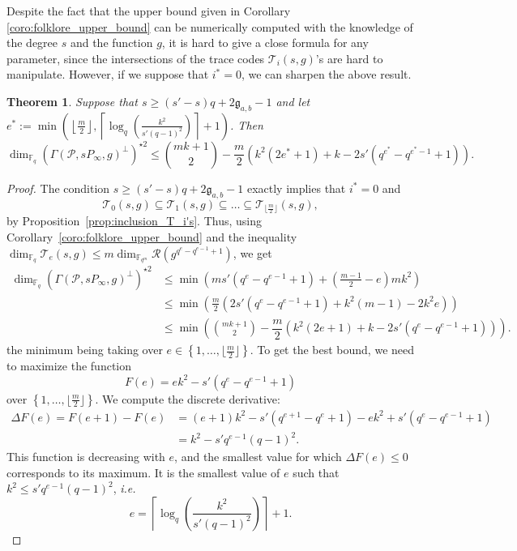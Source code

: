 \documentclass[lettersize,journal]{IEEEtran}
\theoremstyle{plain}
\newtheorem{thm}{Theorem}[section]
\theoremstyle{definition}
\theoremstyle{remark}
\newcommand{\calP}{\mathcal{P}}
\newcommand{\calR}{\mathcal{R}}
\newcommand{\calT}{\mathcal{T}}
\newcommand{\fqm}{\mathbb{F}_{q^m}}
\newcommand{\fq}{\mathbb{F}_{q}}
\newcommand{\set}[1]{\left\{#1\right\}}
\begin{document}
	Despite the fact that the upper bound given in Corollary \ref{coro:folklore_upper_bound} can be numerically computed with the knowledge of the degree $s$ and the function $g$, it is hard to give a close formula for any parameter, since the intersections of the trace codes $\calT_i(s,g)$'s are hard to manipulate. However, if we suppose that $i^*=0$, we can sharpen the above result.
	
	\begin{thm} \label{thm:bound_with_T_i's_inclusion} 
		Suppose that $s \geq (s'-s)q+2\mathfrak{g}_{a,b}-1$ and let $e^* := \min\left(\left\lfloor \frac{m}{2} \right\rfloor, \left\lceil \log_q\left(\frac{k^2}{s'(q-1)^2}\right)\right\rceil+1\right)$. Then
		$$\dim_{\fq} (\Gamma(\calP,sP_\infty,g)^{\perp})^{\star 2}\leq \binom{mk+1}{2} - \dfrac{m}{2}(k^2(2e^*+1)+k-2s'(q^{e^*}-q^{e^*-1}+1)). $$
	\end{thm}
	
	\begin{proof}
		The condition $s \geq (s'-s)q+2\mathfrak{g}_{a,b}-1$ exactly implies that $i^*=0$ and $$\calT_0(s,g) \subseteq \calT_1(s,g) \subseteq \dots \subseteq \calT_{\lfloor \frac{m}{2}\rfloor}(s,g),$$ 
		by Proposition~\ref{prop:inclusion_T_i's}. Thus, using Corollary~\ref{coro:folklore_upper_bound} and the inequality $\dim_{\fq}\calT_e(s,g) \leq m \dim_{\fqm} \calR(g^{q^e-q^{e-1}+1})$, we get
		\begin{align*}
			\dim_{\fq} (\Gamma(\calP,sP_\infty,g)^{\perp})^{\star 2}
			& \leq \min \left(ms'(q^e-q^{e-1}+1) + \left( \frac{m-1}{2} -e \right)mk^2 \right)\\
			& \leq \min \left(\frac{m}{2}\left(2s'(q^e-q^{e-1}+1)+k^2(m-1)-2k^2e  \right)\right) \\
			& \leq \min\left(\binom{mk+1}{2} - \dfrac{m}{2}\left(k^2(2e+1)+k-2s'(q^e-q^{e-1}+1)\right)\right).
		\end{align*}
		the minimum being taking over $e \in \set{1,\dots,\lfloor \frac{m}{2} \rfloor}$. 
		To get the best bound, we need to maximize the function
		$$F(e) = ek^2-s'(q^e-q^{e-1}+1)$$
		over $\set{1,\dots,\lfloor \frac{m}{2} \rfloor}$.
		We compute the discrete derivative:
		\begin{align*}
			\Delta F(e) = F(e+1)-F(e) &= (e+1)k^2- s'(q^{e+1}-q^e+1) - ek^2 + s'(q^e-q^{e-1}+1) \\
			&= k^2 - s'q^{e-1}(q-1)^2.
		\end{align*}
		This function is decreasing with $e$, and the smallest value for which $\Delta F(e) \leq 0$ corresponds to its maximum. It is the smallest value of $e$ such that $k^2 \leq s'q^{e-1}(q-1)^2$, \emph{i.e.}
		$$e =  \left\lceil \log_q\left(\dfrac{k^2}{s'(q-1)^2}\right)\right\rceil+1.$$
	\end{proof}
	
\end{document}
